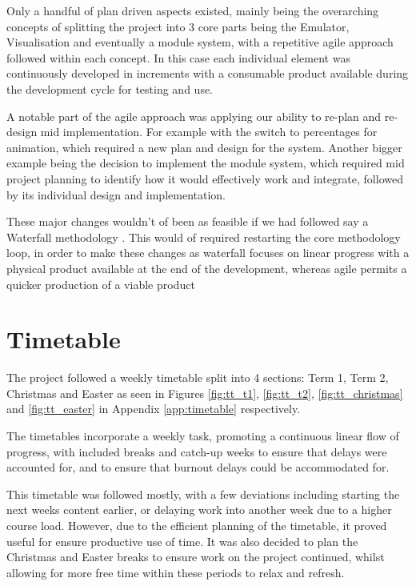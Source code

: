 Only a handful of plan driven aspects existed, mainly being the overarching concepts of splitting the project into 3 core parts being the Emulator, Visualisation and eventually a module system, with a repetitive agile approach followed within each concept. In this case each individual element was continuously developed in increments with a consumable product available during the development cycle for testing and use.

A notable part of the agile approach was applying our ability to re-plan and re-design mid implementation. For example with the switch to percentages for animation, which required a new plan and design for the system. Another bigger example being the decision to implement the module system, which required mid project planning to identify how it would effectively work and integrate, followed by its individual design and implementation.

These major changes wouldn't of been as feasible if we had followed say a Waterfall methodology \cite{ganttchartsoftware_2023_waterfall}. This would of required restarting the core methodology loop, in order to make these changes as waterfall focuses on linear progress with a physical product available at the end of the development, whereas agile permits a quicker production of a viable product

\section{Timetable}
The project followed a weekly timetable split into 4 sections: Term 1, Term 2, Christmas and Easter as seen in Figures \ref{fig:tt_t1}, \ref{fig:tt_t2}, \ref{fig:tt_christmas} and \ref{fig:tt_easter} in Appendix \ref{app:timetable} respectively.

The timetables incorporate a weekly task, promoting a continuous linear flow of progress, with included breaks and catch-up weeks to ensure that delays were accounted for, and to ensure that burnout delays could be accommodated for. 

This timetable was followed mostly, with a few deviations including starting the next weeks content earlier, or delaying work into another week due to a higher course load. However, due to the efficient planning of the timetable, it proved useful for ensure productive use of time. It was also decided to plan the Christmas and Easter breaks to ensure work on the project continued, whilst allowing for more free time within these periods to relax and refresh.

